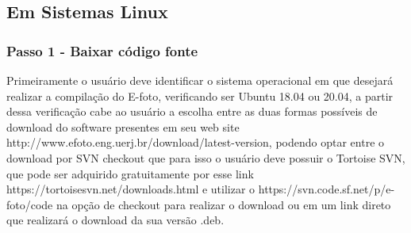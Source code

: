 \subsection{Em Sistemas Linux}

\subsubsection{Passo 1 - Baixar código fonte}
Primeiramente o usuário deve identificar o sistema operacional em que desejará realizar a compilação do E-foto, verificando ser Ubuntu 18.04 ou 20.04, %
 a partir dessa verificação cabe ao usuário a escolha entre as duas formas possíveis %
  de download do software presentes em seu web site http://www.efoto.eng.uerj.br/download/latest-version, podendo optar entre o download por SVN checkout que para isso o usuário deve possuir o Tortoise SVN,%
   que pode ser adquirido gratuitamente %
    por esse link https://tortoisesvn.net/downloads.html e utilizar o https://svn.code.sf.net/p/e-foto/code na opção de checkout%
    para realizar o download ou em um link direto que realizará o download da sua versão .deb. 
    

